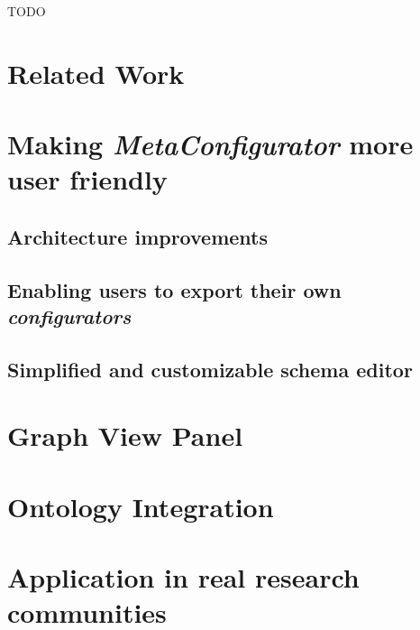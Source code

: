 \documentclass[lettersize,journal]{IEEEtran}
\newcommand{\toolname}{\textit{MetaConfigurator}}
\begin{document}
TODO

 \section{Related Work}\label{sec:research}
 


 \section{Making \toolname{} more user friendly}\label{sec:design_and_implementation}
 

 \subsection{Architecture improvements}\label{subsec:architecture_rework}
 
 
 
 
 \subsection{Enabling users to export their own \textit{configurators}}\label{subsec:custom_configurator}
 
 
 
 \subsection{Simplified and customizable schema editor}\label{subsec:better_schema_editor}
 


 
 \section{Graph View Panel}\label{sec:graph_view}
 
 
 

 \section{Ontology Integration}\label{sec:ontology_integration}
 


 \section{Application in real research communities}\label{sec:application}
 
\end{document}

